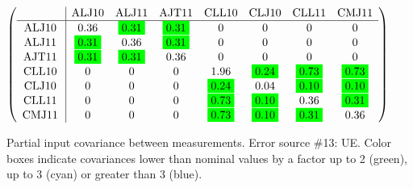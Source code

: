 \begin{table}[H]
\scriptsize
\begin{center}
\renewcommand{\arraystretch}{1.1}
\begin{math}\left(\begin{array}{c|ccccccc}
 & \mathrm{ALJ10} & 
\mathrm{ALJ11} & 
\mathrm{AJT11} & 
\mathrm{CLL10} & 
\mathrm{CLJ10} & 
\mathrm{CLL11} & 
\mathrm{CMJ11} \\
\hline
\mathrm{ALJ10} \hspace*{2pt} &       0.36 &  \colorbox{Green1}{$      0.31$} &  \colorbox{Green1}{$      0.31$} &  0 &  0 &  0 &  0 \\
\mathrm{ALJ11} \hspace*{2pt} &  \colorbox{Green1}{$      0.31$} &       0.36 &  \colorbox{Green1}{$      0.31$} &  0 &  0 &  0 &  0 \\
\mathrm{AJT11} \hspace*{2pt} &  \colorbox{Green1}{$      0.31$} &  \colorbox{Green1}{$      0.31$} &       0.36 &  0 &  0 &  0 &  0 \\
\mathrm{CLL10} \hspace*{2pt} &  0 &  0 &  0 &       1.96 &  \colorbox{Green1}{$      0.24$} &  \colorbox{Green1}{$      0.73$} &  \colorbox{Green1}{$      0.73$} \\
\mathrm{CLJ10} \hspace*{2pt} &  0 &  0 &  0 &  \colorbox{Green1}{$      0.24$} &       0.04 &  \colorbox{Green1}{$      0.10$} &  \colorbox{Green1}{$      0.10$} \\
\mathrm{CLL11} \hspace*{2pt} &  0 &  0 &  0 &  \colorbox{Green1}{$      0.73$} &  \colorbox{Green1}{$      0.10$} &       0.36 &  \colorbox{Green1}{$      0.31$} \\
\mathrm{CMJ11} \hspace*{2pt} &  0 &  0 &  0 &  \colorbox{Green1}{$      0.73$} &  \colorbox{Green1}{$      0.10$} &  \colorbox{Green1}{$      0.31$} &       0.36 \\
\end{array}\right)\end{math}
\caption{Partial input covariance between measurements. Error source \#13: UE. Color boxes indicate covariances lower than nominal values by a factor up to 2 (green), up to 3 (cyan) or greater than 3 (blue).}
\renewcommand{\arraystretch}{1}
\end{center}
\end{table}
